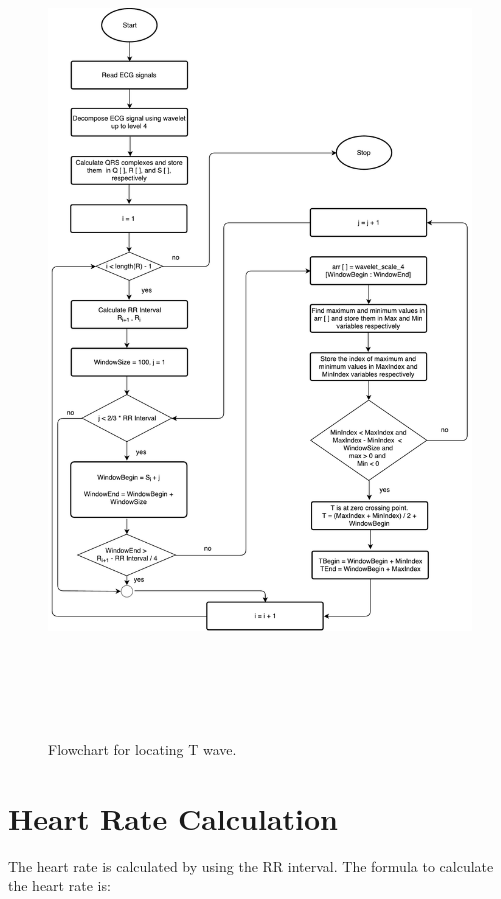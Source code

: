 \begin{figure}[htpb]
	\centering
	\includegraphics[width=25cm,height=22cm,keepaspectratio=true]{images/T_Wave.pdf}
	\caption{
		Flowchart for locating T wave.
	}
	\label{fig:t_peaks_flow_chart}
\end{figure}


\section{Heart Rate Calculation}
The heart rate is calculated by using the RR interval. The formula to calculate the heart rate is:


